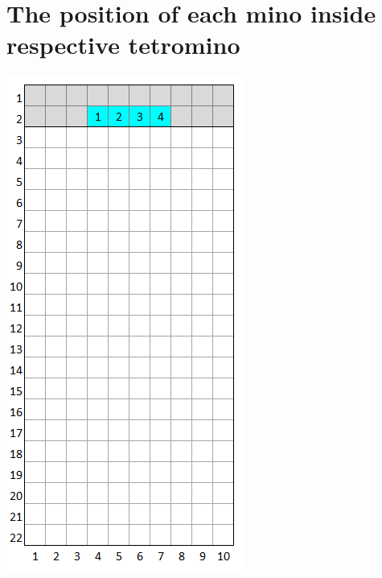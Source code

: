 \documentclass[a4paper]{article}
\begin{document}
\section{The position of each mino inside respective tetromino}

	\centering
	\begin{minipage}{0.2\textwidth}
		\centering
		\includegraphics[scale=0.4]{resources/img/minos/mino_cyan}
		\label{fig:mino-cyan}
	\end{minipage}%
\end{document}
